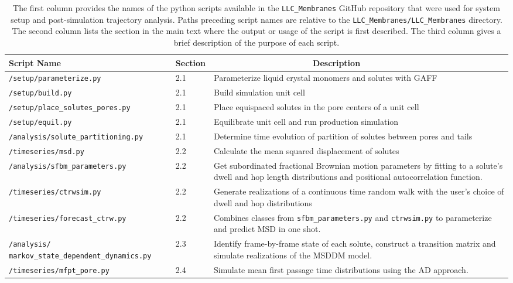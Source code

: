 \documentclass{article}
\begin{document}
  \begin{table}[htb!]
  \centering
  \begin{tabular}{|A|B|C|}
  \hline
  \textbf{Script Name} & \textbf{Section} & ~~~~~~~~~~~~~~~~~~~~~\textbf{Description} \\
  \hline

  \texttt{/setup/parameterize.py}            & 2.1 & Parameterize liquid crystal monomers and solutes with GAFF \\ \hline
  \texttt{/setup/build.py}                   & 2.1 & Build simulation unit cell \\ \hline
  \texttt{/setup/place\_solutes\_pores.py}   & 2.1 & Place equispaced solutes in the pore centers of a unit cell \\\hline
  \texttt{/setup/equil.py}                   & 2.1 & Equilibrate unit cell and run production simulation \\\hline
  \texttt{/analysis/solute\_partitioning.py} & 2.1 & Determine time evolution of partition of solutes between pores and tails \\\hline
  \texttt{/timeseries/msd.py}                & 2.2 & Calculate the mean squared displacement of solutes \\\hline
  \texttt{/analysis/sfbm\_parameters.py}     & 2.2 & Get subordinated fractional Brownian motion parameters by fitting to a solute's dwell and hop length distributions and positional autocorrelation function. \\\hline
  \texttt{/timeseries/ctrwsim.py}            & 2.2 & Generate realizations of a continuous time random walk with the user's choice of dwell and hop distributions \\\hline
  \texttt{/timeseries/forecast\_ctrw.py}     & 2.2 & Combines classes from \texttt{sfbm\_parameters.py} and \texttt{ctrwsim.py} to parameterize and predict MSD in one shot. \\\hline
  \texttt{/analysis/ markov\_state\_dependent\_dynamics.py} & 2.3 & Identify frame-by-frame state of each solute, construct a transition matrix and simulate realizations of the MSDDM model. \\\hline
  \texttt{/timeseries/mfpt\_pore.py}          & 2.4 & Simulate mean first passage time distributions using the AD approach. \\\hline 
  \end{tabular}

  \caption{The first column provides the names of the python scripts available in
  the \texttt{LLC\_Membranes} GitHub repository that were used for system setup and
  post-simulation trajectory analysis. Paths preceding script names are relative to the
  \texttt{LLC\_Membranes/LLC\_Membranes} directory. The second column lists the section in the main
  text where the output or usage of the script is first described. The third column
  gives a brief description of the purpose of each script.
  }~\label{table:python_scripts}

  \end{table}
  
\end{document}
